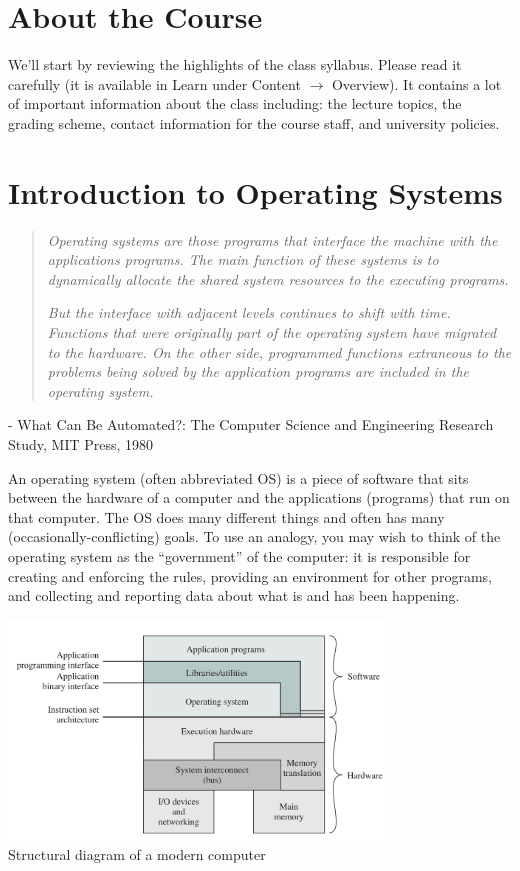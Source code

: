 




\section*{About the Course}
We'll start by reviewing the highlights of the class syllabus. Please read it carefully (it is available in Learn under Content $\rightarrow$ Overview). It contains a lot of important information about the class including: the lecture topics, the grading scheme, contact information for the course staff, and university policies.

\section*{Introduction to Operating Systems}


\begin{quote}
\textit{Operating systems are those programs that interface the machine with the applications programs. The main function of these systems is to dynamically allocate the shared system resources to the executing programs.}

\textit{But the interface with adjacent levels continues to shift with
time. Functions that were originally part of the operating system have migrated to the hardware. On the other side, programmed functions extraneous to the problems being solved by the application programs are included in the operating system.
}
\end{quote}

\hfill - What Can Be Automated?: The Computer Science and Engineering Research Study, MIT Press, 1980

An operating system (often abbreviated OS) is a piece of software that sits between the hardware of a computer and the applications (programs) that run on that computer. The OS does many different things and often has many (occasionally-conflicting) goals. To use an analogy, you may wish to think of the operating system as the ``government'' of the computer: it is responsible for creating and enforcing the rules, providing an environment for other programs, and collecting and reporting data about what is and has been happening.

\begin{center}
\includegraphics[width=0.75\textwidth]{images/os-sw-hw.png}\\
Structural diagram of a modern computer~\cite{osi}
\end{center}

